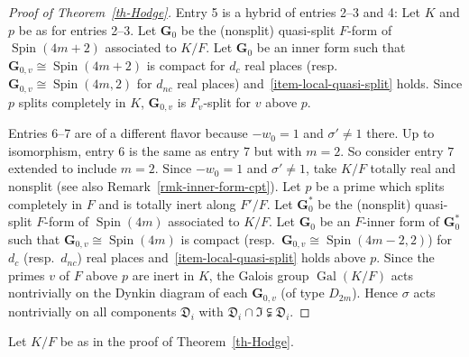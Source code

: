 \documentclass[11pt]{amsart}
\numberwithin{equation}{section}
\theoremstyle{definition}
\theoremstyle{remark}
\newcommand{\Dfr}{{\mathfrak D}}
\newcommand{\Ifr}{{\mathfrak I}}
\DeclareMathOperator{\gal}{Gal}
\DeclareMathOperator{\Spin}{Spin}
\begin{document}
\begin{proof}[Proof of Theorem~\ref{th-Hodge}]
Entry 5 is a hybrid of entries 2--3 and 4: Let $K$ and $p$ be as for entries 2--3. Let $\mathbf{G}_0$ be the (nonsplit) quasi-split $F$-form of $\Spin(4m+2)$ associated to $K/F$.  
Let $\mathbf{G}_0$ be an inner form such that $\mathbf{G}_{0,v} \cong \Spin(4m+2)$ is compact for $d_c$ real places (resp.\ $\mathbf{G}_{0,v} \cong \Spin(4m,2)$ for $d_{nc}$ real places) and~\eqref{item-local-quasi-split} holds. Since $p$ splits completely in $K$, $\mathbf{G}_{0,v}$ is $F_v$-split for $v$ above $p$.   

Entries 6--7 are of a different flavor because $-w_0=1$ and $\sigma' \neq 1$ there. Up to isomorphism, entry 6 is the same as entry 7 but with $m=2$. So consider entry $7$ extended to include $m=2$. Since $-w_0=1$ and $\sigma' \neq 1$, take $K/F$ totally real and nonsplit (see also Remark~\ref{rmk-inner-form-cpt}). Let $p$ be a prime which splits completely in $F$ and is totally inert along $F'/F$. Let $\mathbf{G}_0^*$ be the (nonsplit) quasi-split $F$-form of $\Spin(4m)$ associated to $K/F$. Let $\mathbf{G}_0$ be an $F$-inner form of $\mathbf{G}_0^*$ such that $\mathbf{G}_{0,v} \cong \Spin(4m)$ is compact (resp.\ $\mathbf{G}_{0,v} \cong \Spin(4m-2,2)$) for $d_c$ (resp.\ $d_{nc}$) real places and~\eqref{item-local-quasi-split} holds above $p$. Since the primes $v$ of $F$ above $p$ are inert in $K$, the Galois group $\gal(K/F)$ acts nontrivially on the Dynkin diagram of each $\mathbf{G}_{0,v}$ (of type $D_{2m}$). Hence $\sigma$ acts nontrivially on all components $\Dfr_i$ with $\Dfr_i \cap \Ifr \subsetneqq \Dfr_i$.       
\end{proof}

Let $K/F$ be as in the proof of Theorem~\ref{th-Hodge}. 
\end{document}
